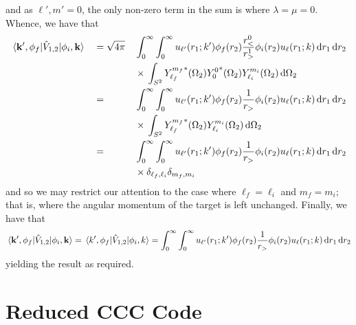 \documentclass{article}
\begin{document}
and as $\ell', m' = 0$, the only non-zero term in the sum is where
$\lambda = \mu = 0$.
Whence, we have that
\begin{alignat*}{3}
  &
  \mel{\vb{k}', \phi_{f}}{\hat{V}_{1, 2}}{\phi_{i}, \vb{k}}
  &{}={}&
  \sqrt{4\pi}
  &&
  \int_{0}^{\infty}
  \int_{0}^{\infty}
  {
    u_{\ell'}(r_{1}; k')
    \phi_{f}(r_{2})
    \dfrac{r_{<}^{0}}{r_{>}^{1}}
    \phi_{i}(r_{2})
    u_{\ell}(r_{1}; k)
  }
  \dd{r_{1}}
  \dd{r_{2}}
  \\
  &
  {}
  &&
  {}
  &&
  {}\times{}
  \int_{S^{2}}
  {
    {Y_{\ell_{f}}^{m_{f}}}^{*}(\Omega_{2})
    {Y_{0}^{0}}^{*}(\Omega_{2})
    Y_{\ell_{i}}^{m_{i}}(\Omega_{2})
  }
  \dd{\Omega_{2}}
  \\
  &
  {}
  &{}={}&
  &&
  \int_{0}^{\infty}
  \int_{0}^{\infty}
  {
    u_{\ell'}(r_{1}; k')
    \phi_{f}(r_{2})
    \dfrac{1}{r_{>}}
    \phi_{i}(r_{2})
    u_{\ell}(r_{1}; k)
  }
  \dd{r_{1}}
  \dd{r_{2}}
  \\
  &
  {}
  &&
  {}
  &&
  {}\times{}
  \int_{S^{2}}
  {
    {Y_{\ell_{f}}^{m_{f}}}^{*}(\Omega_{2})
    Y_{\ell_{i}}^{m_{i}}(\Omega_{2})
  }
  \dd{\Omega_{2}}
  \\
  &
  {}
  &{}={}&
  &&
  \int_{0}^{\infty}
  \int_{0}^{\infty}
  {
    u_{\ell'}(r_{1}; k')
    \phi_{f}(r_{2})
    \dfrac{1}{r_{>}}
    \phi_{i}(r_{2})
    u_{\ell}(r_{1}; k)
  }
  \dd{r_{1}}
  \dd{r_{2}}
  \\
  &
  {}
  &&
  {}
  &&
  {}\times{}
  \delta_{\ell_{f}, \ell_{i}}
  \delta_{m_{f}, m_{i}}
\end{alignat*}
and so we may restrict our attention to the case where
$\ell_{f} = \ell_{i}$ and $m_{f} = m_{i}$; that is, where the angular momentum
of the target is left unchanged.
Finally, we have that
\begin{equation*}
  \mel{\vb{k}', \phi_{f}}{\hat{V}_{1, 2}}{\phi_{i}, \vb{k}}
  =
  \mel{k', \phi_{f}}{\hat{V}_{1, 2}}{\phi_{i}, k}
  =
  \int_{0}^{\infty}
  \int_{0}^{\infty}
  {
    u_{\ell'}(r_{1}; k')
    \phi_{f}(r_{2})
    \dfrac{1}{r_{>}}
    \phi_{i}(r_{2})
    u_{\ell}(r_{1}; k)
  }
  \dd{r_{1}}
  \dd{r_{2}}
\end{equation*}
yielding the result as required.

\section{Reduced CCC Code}
\label{sec:reduced-ccc-code}
\end{document}
